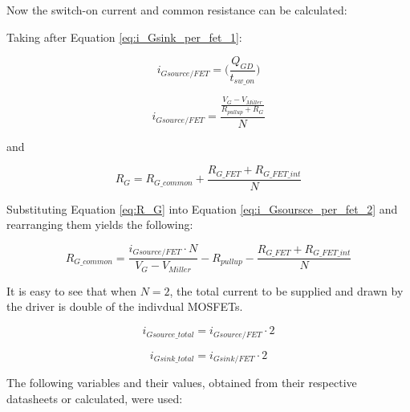     Now the switch-on current and common resistance can be calculated:
    
    Taking after Equation \ref{eq:i_Gsink_per_fet_1}:

    \begin{equation}
        i_{Gsource/FET} = \bigg( \frac{Q_{GD}}{t_{sw{\_}on}} \bigg)
        \label{eq:i_Gsource_per_fet_1}
    \end{equation}    
    
    
    
    \begin{equation}
        i_{Gsource/FET} = \frac{\frac{V_G - V_{Miller}}{R_{pullup} + R_G}}{N}
        \label{eq:i_Gsoursce_per_fet_2}
    \end{equation}
    
    and
    
    \begin{equation}
        R_G = R_{G{\_}common} + \frac{R_{G{\_}FET} + R_{G{\_}FET{\_}int}}{N}
        \label{eq:R_G}
    \end{equation}
    
    Substituting Equation \ref{eq:R_G} into Equation \ref{eq:i_Gsoursce_per_fet_2} and rearranging them yields the following:
    
    \begin{equation}
        R_{G{\_}common} = \frac{i_{Gsource/FET} \cdot N}{V_G - V_{Miller}} - R_{pullup} - \frac{R_{G{\_}FET} + R_{G{\_}FET{\_}int}}{N}
        \label{eq:R_G_common}
    \end{equation}
    
    It is easy to see that when $N = 2$, the total current to be supplied and drawn by the driver is double of the indivdual MOSFETs.
    
    
    \begin{equation}
        i_{Gsource{\_}total} = i_{Gsource/FET} \cdot 2
        \label{eq:i_G_source_total}
    \end{equation}
    
    \begin{equation}
        i_{Gsink{\_}total} = i_{Gsink/FET} \cdot 2
        \label{eq:i_G_sink_total}
    \end{equation}
    
    The following variables and their values, obtained from their respective datasheets or calculated, were used:
    
